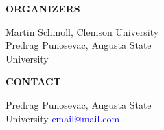 \begin{minipage}{0.8\textwidth}
\begin{minipage}[b]{0.37\textwidth}
\lorem\lorem\lorem

\medskip
\textbf{\large ORGANIZERS}\par
Martin Schmoll, Clemson University\\
Predrag Punosevac, Augusta State \\
University
\medskip

\textbf{\large CONTACT }\par

Predrag Punosevac, Augusta State\\
University
\textcolor{blue}{email@mail.com}

\rule{0pt}{78pt}
\end{minipage}
\vspace*{-70pt}

\\
\end{minipage}
%